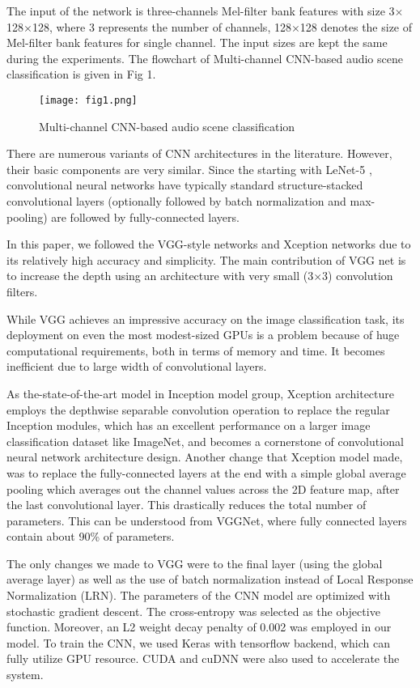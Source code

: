 \documentclass[conference]{IEEEtran}
\begin{document}
The input of the network is three-channels Mel-filter bank features with size 3$\times$128$\times$128, where 3 represents the number of channels, 128$\times$128 denotes the size of Mel-filter bank features for single channel. The input sizes are kept the same during the experiments. The flowchart of Multi-channel CNN-based audio scene classification is given in Fig 1.

\begin{figure}[!ht]
	\centering
	\texttt{[image: fig1.png]}
	\caption{Multi-channel CNN-based audio scene classification}
	\label{fig1}
\end{figure}

There are numerous variants of CNN architectures in the literature. However, their basic components are very similar. Since the starting with LeNet-5 \cite{b23}, convolutional neural networks have typically standard structure-stacked convolutional layers (optionally followed by batch normalization and max-pooling) are followed by fully-connected layers.

In this paper, we followed the VGG-style \cite{b24} networks and Xception \cite{b25} networks due to its relatively high accuracy and simplicity. The main contribution of VGG net is to increase the depth using an architecture with very small (3$\times$3) convolution filters.

While VGG achieves an impressive accuracy on the image classification task, its deployment on even the most modest-sized GPUs is a problem because of huge computational requirements, both in terms of memory and time. It becomes inefficient due to large width of convolutional layers.

As the-state-of-the-art model in Inception model group, Xception architecture employs the depthwise separable convolution operation to replace the regular Inception modules, which has an excellent performance on a larger image classification dataset like ImageNet, and becomes a cornerstone of convolutional neural network architecture design. Another change that Xception model made, was to replace the fully-connected layers at the end with a simple global average pooling which averages out the channel values across the 2D feature map, after the last convolutional layer. This drastically reduces the total number of parameters. This can be understood from VGGNet, where fully connected layers contain about 90\% of parameters.

The only changes we made to VGG were to the final layer (using the global average layer) as well as the use of batch normalization instead of Local Response Normalization (LRN). The parameters of the CNN model are optimized with stochastic gradient descent. The cross-entropy was selected as the objective function. Moreover, an L2 weight decay penalty of 0.002 was employed in our model. To train the CNN, we used Keras with tensorflow backend, which can fully utilize GPU resource. CUDA and cuDNN were also used to accelerate the system.
\end{document}
